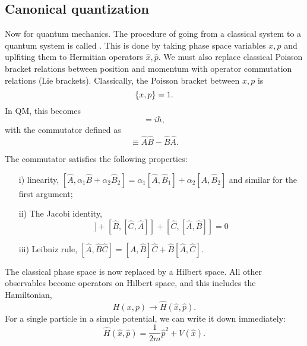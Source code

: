 \subsection*{Canonical quantization}
Now for quantum mechanics. The procedure of going from a classical system to a quantum system is called . This is done by taking phase space variables $x,p$ and uplfiting them to Hermitian operators $\hat x, \hat p$. We must also replace classical Poisson bracket relations between position and momentum with operator commutation relations (Lie brackets). Classically, the Poisson bracket between $x,p$ is
\begin{equation}
    \{x,p\}=1.
\end{equation}
In QM, this becomes
\begin{equation}
    [\hat x, \hat p] = i\hbar,
\end{equation}
with the commutator defined as
\begin{equation}
    [\hat A,\hat B] \equiv \hat A \hat B - \hat B \hat A.
\end{equation}

The commutator satisfies the following properties:
\begin{enumerate}
    \item[i)] linearity, $[\hat A,\alpha_1 \hat B + \alpha_2 \hat B_2] = \alpha_1 [\hat A,\hat B_1]+\alpha_2 [\hat A,\hat B_2]$ and similar for the first argument;
    \item[ii)] The Jacobi identity,
    \begin{equation}
        [\hat A,[\hat B,\hat C]] + [\hat B,[\hat C, \hat A]] + [\hat C,[\hat A, \hat B]]=0
    \end{equation}
    \item[iii)] Leibniz rule, $[\hat A,\hat B \hat C]= [\hat A,\hat B]\hat C + \hat B[\hat A,\hat C]$.
\end{enumerate}

The classical phase space is now replaced by a Hilbert space. All other observables become operators on Hilbert space, and this includes the Hamiltonian,
\begin{equation}
    H(x,p) \to \hat H (\hat x, \hat p).
\end{equation}
For a single particle in a simple potential, we can write it down immediately:
\begin{equation}
    \hat H(\hat x,\hat p) = \frac{1}{2m} \hat p^2 + V(\hat x).
\end{equation}

